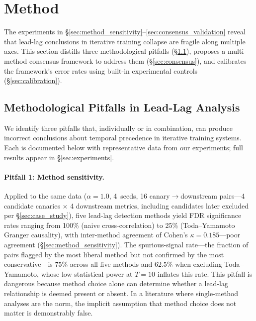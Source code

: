 \section{Method}
\label{sec:method}

The experiments in \S\ref{sec:method_sensitivity}--\ref{sec:consensus_validation} reveal that lead-lag conclusions in iterative training collapse are fragile along multiple axes.
This section distills three methodological pitfalls (\S\ref{sec:pitfalls}), proposes a multi-method consensus framework to address them (\S\ref{sec:consensus}), and calibrates the framework's error rates using built-in experimental controls (\S\ref{sec:calibration}).


\subsection{Methodological Pitfalls in Lead-Lag Analysis}
\label{sec:pitfalls}

We identify three pitfalls that, individually or in combination, can produce incorrect conclusions about temporal precedence in iterative training systems.
Each is documented below with representative data from our experiments; full results appear in \S\ref{sec:experiments}.

\paragraph{Pitfall 1: Method sensitivity.}
Applied to the same data ($\alpha{=}1.0$, 4~seeds, 16 canary$\to$downstream pairs---4 candidate canaries $\times$ 4 downstream metrics, including candidates later excluded per \S\ref{sec:case_study}), five lead-lag detection methods yield FDR significance rates ranging from 100\% (naive cross-correlation) to 25\% (Toda--Yamamoto Granger causality), with inter-method agreement of Cohen's $\kappa{=}0.185$---poor agreement (\S\ref{sec:method_sensitivity}).
The spurious-signal rate---the fraction of pairs flagged by the most liberal method but not confirmed by the most conservative---is 75\% across all five methods and 62.5\% when excluding Toda--Yamamoto, whose low statistical power at $T{=}10$ inflates this rate.
This pitfall is dangerous because method choice alone can determine whether a lead-lag relationship is deemed present or absent.
In a literature where single-method analyses are the norm, the implicit assumption that method choice does not matter is demonstrably false.


